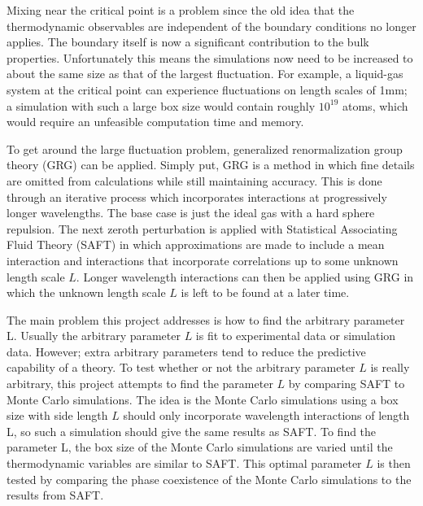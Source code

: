 Mixing near the critical point is a problem since the old idea that the thermodynamic observables are independent of the boundary conditions no longer applies. The boundary itself is now a significant contribution to the bulk properties. Unfortunately this means the simulations now need to be increased to about the same size as that of the largest fluctuation. For example, a liquid-gas system at the critical point can experience fluctuations on length scales of 1mm; a simulation with such a large box size would contain roughly $10^{19}$ atoms, which would require an unfeasible computation time and memory.

To get around the large fluctuation problem, generalized renormalization group theory (GRG)\cite{Forte2011} can be applied. Simply put, GRG is a method in which fine details are omitted from calculations while still maintaining accuracy. This is done through an iterative process which incorporates interactions at progressively longer wavelengths. The base case is just the ideal gas with a hard sphere repulsion. The next zeroth perturbation is applied with Statistical Associating Fluid Theory (SAFT) in which approximations are made to include a mean interaction and interactions that incorporate correlations up to some unknown length scale $L$. Longer wavelength interactions can then be applied using GRG in which the unknown length scale $L$ is left to be found at a later time.

The main problem this project addresses is how to find the arbitrary parameter L. Usually the arbitrary parameter $L$ is fit to experimental data or simulation data. However; extra arbitrary parameters tend to reduce the predictive capability of a theory. To test whether or not the arbitrary parameter $L$ is really arbitrary, this project attempts to find the parameter $L$ by comparing SAFT to Monte Carlo simulations. The idea is the Monte Carlo simulations using a box size with side length $L$ should only incorporate wavelength interactions of length L, so such a simulation should give the same results as SAFT. To find the parameter L, the box size of the Monte Carlo simulations are varied until the thermodynamic variables are similar to SAFT. This optimal parameter $L$ is then tested by comparing the phase coexistence of the Monte Carlo simulations to the results from SAFT.
